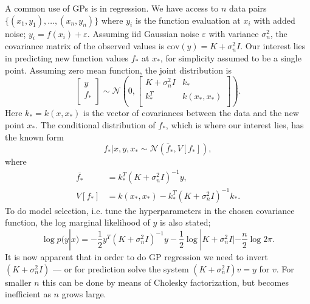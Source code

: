 \documentclass{article}
\theoremstyle{plain}
\theoremstyle{definition}
\theoremstyle{remark}
\begin{document}
A common use of GPs is in regression.
We have access to $n$ data pairs $\{(x_1, y_1), \hdots, (x_n, y_n)\}$ where $y_i$ is the function evaluation at $x_i$ with added noise; $y_i = f(x_i) + \varepsilon$.
Assuming iid Gaussian noise $\varepsilon$ with variance $\sigma_n^2$, the covariance matrix of the observed values is $\text{cov}(y) = K + \sigma_n^2I$.
Our interest lies in predicting new function values $f_*$ at $x_*$, for simplicity assumed to be a single point.
Assuming zero mean function, the joint distribution is
\begin{equation*}
\begin{bmatrix}
        y \\
        f_* \\
\end{bmatrix} \sim \mathcal{N} \left( 
0,
\begin{bmatrix}
        K + \sigma_n^2I & k_* \\
        k_*^T & k(x_*, x_*) \\
\end{bmatrix}
\right).
\end{equation*}
Here $k_* = k(x, x_*)$ is the vector of covariances between the data and the new point $x_*$. The conditional distribution of $f_*$, which is where our interest lies, has the known form
\begin{equation*}
       f_* | x, y, x_* \sim \mathcal{N}(\bar{f}_*, V[f_*]),
\end{equation*}
where 
\begin{align}
        \label{gp_pred}
        \bar{f_*} &= k_*^T (K + \sigma_n^2I)^{-1}y, \\
        V[f_*] &= k(x_*, x_*) - k_*^T (K + \sigma_n^2 I)^{-1}k_*.
\end{align}
To do model selection, i.e. tune the hyperparameters in the chosen covariance function, the log marginal likelihood of $y$ is also stated;
\begin{equation}
       \log p(y | x) = -\frac{1}{2}y^T(K + \sigma_n^2I)^{-1}y - \frac{1}{2} \log |K + \sigma_n^2 I| - \frac{n}{2} \log 2\pi. 
\end{equation}
It is now apparent that in order to do GP regression we need to invert $(K + \sigma_n^2I)$ — or for prediction solve the system $(K + \sigma_n^2I)v = y$ for $v$. 
For smaller $n$ this can be done by means of Cholesky factorization, but becomes inefficient as $n$ grows large.
\end{document}
